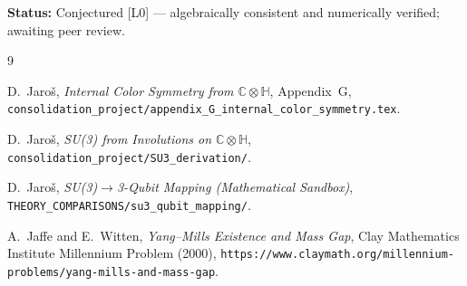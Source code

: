 \documentclass[12pt,a4paper]{article}
\newcommand{\CCC}{\mathbb{C}}
\newcommand{\HH}{\mathbb{H}}
\begin{document}
\bigskip
\noindent\textbf{Status:} Conjectured [L0] — algebraically consistent and
numerically verified; awaiting peer review.

\begin{thebibliography}{9}

D.\ Jaroš, \textit{Internal Color Symmetry from $\CCC \otimes \HH$},
Appendix~G, \texttt{consolidation\_project/appendix\_G\_internal\_color\_symmetry.tex}.

D.\ Jaroš, \textit{SU(3) from Involutions on $\CCC \otimes \HH$},
\texttt{consolidation\_project/SU3\_derivation/}.

D.\ Jaroš, \textit{SU(3)$\to$3-Qubit Mapping (Mathematical Sandbox)},
\texttt{THEORY\_COMPARISONS/su3\_qubit\_mapping/}.

A.\ Jaffe and E.\ Witten, \textit{Yang--Mills Existence and Mass Gap},
Clay Mathematics Institute Millennium Problem (2000),
\texttt{https://www.claymath.org/millennium-problems/yang-mills-and-mass-gap}.

\end{thebibliography}
\end{document}
